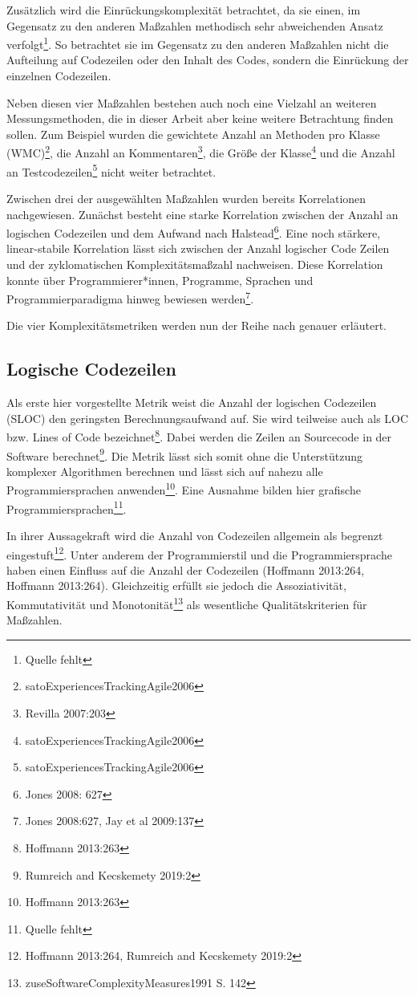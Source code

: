 Zusätzlich wird die Einrückungskomplexität betrachtet, da sie einen, im
Gegensatz zu den anderen Maßzahlen methodisch sehr abweichenden Ansatz
verfolgt\footnote{Quelle fehlt}. So betrachtet sie im Gegensatz zu den
anderen Maßzahlen nicht die Aufteilung auf Codezeilen oder den Inhalt
des Codes, sondern die Einrückung der einzelnen Codezeilen.

Neben diesen vier Maßzahlen bestehen auch noch eine Vielzahl an weiteren
Messungsmethoden, die in dieser Arbeit aber keine weitere Betrachtung
finden sollen. Zum Beispiel wurden die gewichtete Anzahl an Methoden pro
Klasse (WMC)\footnote{satoExperiencesTrackingAgile2006}, die Anzahl an
Kommentaren\footnote{Revilla 2007:203}, die Größe der Klasse\footnote{satoExperiencesTrackingAgile2006}
und die Anzahl an Testcodezeilen\footnote{satoExperiencesTrackingAgile2006}
nicht weiter betrachtet.

Zwischen drei der ausgewählten Maßzahlen wurden bereits Korrelationen
nachgewiesen. Zunächst besteht eine starke Korrelation zwischen der
Anzahl an logischen Codezeilen und dem Aufwand nach Halstead\footnote{Jones
  2008: 627}. Eine noch stärkere, linear-stabile Korrelation lässt sich
zwischen der Anzahl logischer Code Zeilen und der zyklomatischen
Komplexitätsmaßzahl nachweisen. Diese Korrelation konnte über
Programmierer*innen, Programme, Sprachen und Programmierparadigma hinweg
bewiesen werden\footnote{Jones 2008:627, Jay et al 2009:137}.

Die vier Komplexitätsmetriken werden nun der Reihe nach genauer
erläutert.

\subsection{Logische Codezeilen}\label{logische-codezeilen}

Als erste hier vorgestellte Metrik weist die Anzahl der logischen
Codezeilen (SLOC) den geringsten Berechnungsaufwand auf. Sie wird
teilweise auch als LOC bzw. Lines of Code bezeichnet\footnote{Hoffmann
  2013:263}. Dabei werden die Zeilen an Sourcecode in der Software
berechnet\footnote{Rumreich and Kecskemety 2019:2}. Die Metrik lässt
sich somit ohne die Unterstützung komplexer Algorithmen berechnen und
lässt sich auf nahezu alle Programmiersprachen anwenden\footnote{Hoffmann
  2013:263}. Eine Ausnahme bilden hier grafische
Programmiersprachen\footnote{Quelle fehlt}.

In ihrer Aussagekraft wird die Anzahl von Codezeilen allgemein als
begrenzt eingestuft\footnote{Hoffmann 2013:264, Rumreich and Kecskemety
  2019:2}. Unter anderem der Programmierstil und die Programmiersprache
haben einen Einfluss auf die Anzahl der Codezeilen (Hoffmann 2013:264,
Hoffmann 2013:264). Gleichzeitig erfüllt sie jedoch die Assoziativität,
Kommutativität und Monotonität\footnote{zuseSoftwareComplexityMeasures1991
  S. 142} als wesentliche Qualitätskriterien für Maßzahlen.

